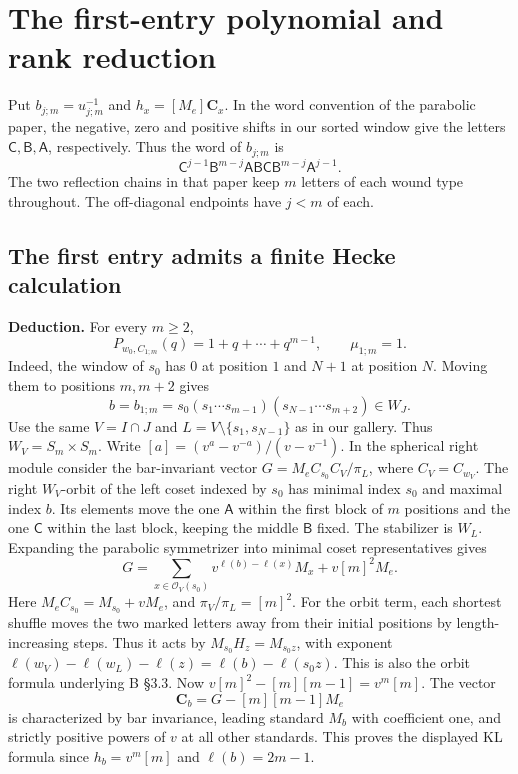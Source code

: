\newpage
\section{The first-entry polynomial and rank reduction}
Put \(b_{j;m}=u_{j;m}^{-1}\) and \(h_x=[M_e]\mathbf C_x\). In the word convention of the parabolic paper,
the negative, zero and positive shifts in our sorted window give the letters
\(\mathsf C,\mathsf B,\mathsf A\), respectively. Thus the word of \(b_{j;m}\) is
\[
 \mathsf C^{j-1}\mathsf B^{m-j}\mathsf A\mathsf B\mathsf C
                  \mathsf B^{m-j}\mathsf A^{j-1}.
\]
The two reflection chains in that paper keep \(m\) letters of each wound type throughout.
The off-diagonal endpoints have \(j<m\) of each.

\subsection*{The first entry admits a finite Hecke calculation}
\textbf{Deduction.} For every \(m\ge2\),
\[
   P_{w_0,C_{1;m}}(q)=1+q+\cdots+q^{m-1},\qquad \mu_{1;m}=1 .
\]
Indeed, the window of \(s_0\) has \(0\) at position \(1\) and \(N+1\) at
position \(N\). Moving them to positions \(m,m+2\) gives
\[
 b=b_{1;m}=s_0(s_1\cdots s_{m-1})(s_{N-1}\cdots s_{m+2})\in W_J .
\]
Use the same \(V=I\cap J\) and \(L=V\setminus\{s_1,s_{N-1}\}\) as in our gallery.
Thus \(W_V=S_m\times S_m\). Write \([a]=(v^a-v^{-a})/(v-v^{-1})\).
In the spherical right module consider the bar-invariant vector
\(G=M_e C_{s_0}C_V/\pi_L\), where \(C_V=C_{w_V}\).
The right \(W_V\)-orbit of the left coset indexed by \(s_0\) has minimal
index \(s_0\) and maximal index \(b\). Its elements move the one
\(\mathsf A\) within the first block of \(m\) positions and the one
\(\mathsf C\) within the last block, keeping the middle \(\mathsf B\) fixed.
The stabilizer is \(W_L\). Expanding the parabolic symmetrizer into
minimal coset representatives gives
\[
 G=\sum_{x\in\mathcal O_V(s_0)}
 v^{\ell(b)-\ell(x)}M_x+v[m]^2M_e .
\]
Here \(M_e C_{s_0}=M_{s_0}+vM_e\), and \(\pi_V/\pi_L=[m]^2\).
For the orbit term, each shortest shuffle moves the two marked letters
away from their initial positions by length-increasing steps. Thus it
acts by \(M_{s_0}H_z=M_{s_0z}\), with exponent
\(\ell(w_V)-\ell(w_L)-\ell(z)=\ell(b)-\ell(s_0z)\).
This is also the orbit formula underlying B \S3.3.
Now \(v[m]^2-[m][m-1]=v^m[m]\). The vector
\[
 \mathbf C_b=G-[m][m-1]M_e
\]
is characterized by bar invariance, leading standard \(M_b\) with
coefficient one, and strictly positive powers of \(v\) at all other
standards. This proves the displayed KL formula since
\(h_b=v^m[m]\) and \(\ell(b)=2m-1\).

